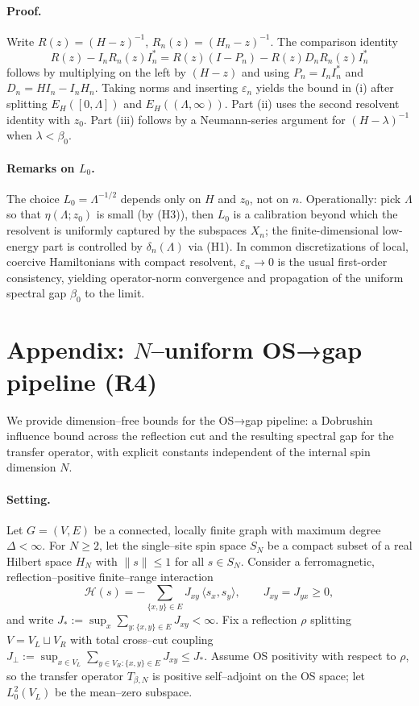 \documentclass[11pt]{amsart}
\theoremstyle{plain}
\theoremstyle{definition}
\theoremstyle{remark}
\begin{document}
\paragraph{Proof.}
Write $R(z)=(H-z)^{-1}$, $R_n(z)=(H_n-z)^{-1}$. The comparison identity
\[
  R(z)-I_n R_n(z) I_n^*= R(z)(I-P_n) - R(z) D_n R_n(z) I_n^*
\]
follows by multiplying on the left by $(H-z)$ and using $P_n=I_n I_n^*$ and $D_n=H I_n-I_n H_n$. Taking norms and inserting $\varepsilon_n$ yields the bound in (i) after splitting $E_H([0,\Lambda])$ and $E_H((\Lambda,\infty))$. Part (ii) uses the second resolvent identity with $z_0$. Part (iii) follows by a Neumann-series argument for $(H-\lambda)^{-1}$ when $\lambda<\beta_0$.

\paragraph{Remarks on $L_0$.}
The choice $L_0=\Lambda^{-1/2}$ depends only on $H$ and $z_0$, not on $n$. Operationally: pick $\Lambda$ so that $\eta(\Lambda;z_0)$ is small (by (H3)), then $L_0$ is a calibration beyond which the resolvent is uniformly captured by the subspaces $X_n$; the finite-dimensional low-energy part is controlled by $\delta_n(\Lambda)$ via (H1). In common discretizations of local, coercive Hamiltonians with compact resolvent, $\varepsilon_n\to 0$ is the usual first-order consistency, yielding operator-norm convergence and propagation of the uniform spectral gap $\beta_0$ to the limit.

\section{Appendix: $N$–uniform OS→gap pipeline (R4)}

We provide dimension–free bounds for the OS→gap pipeline: a Dobrushin influence bound across the reflection cut and the resulting spectral gap for the transfer operator, with explicit constants independent of the internal spin dimension $N$.

\paragraph{Setting.}
Let $G=(V,E)$ be a connected, locally finite graph with maximum degree $\Delta<\infty$. For $N\ge 2$, let the single–site spin space $S_N$ be a compact subset of a real Hilbert space $H_N$ with $\|s\|\le 1$ for all $s\in S_N$. Consider a ferromagnetic, reflection–positive finite–range interaction
\[
  \mathcal{H}(s)= -\sum_{\{x,y\}\in E} J_{xy}\,\langle s_x,s_y\rangle,\qquad J_{xy}=J_{yx}\ge 0,
\]
and write $J_{\!*}:=\sup_x \sum_{y:\{x,y\}\in E} J_{xy}<\infty$. Fix a reflection $\rho$ splitting $V=V_L\sqcup V_R$ with total cross–cut coupling $J_{\perp}:=\sup_{x\in V_L}\sum_{y\in V_R:\{x,y\}\in E} J_{xy}\le J_{\!*}$. Assume OS positivity with respect to $\rho$, so the transfer operator $T_{\beta,N}$ is positive self–adjoint on the OS space; let $L^2_0(V_L)$ be the mean–zero subspace.
\end{document}

